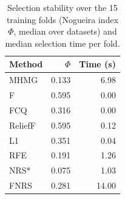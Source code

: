 \begin{table}[!t]
\centering
\caption{Selection stability over the 15 training folds (Nogueira index $\Phi$, median over datasets) and median selection time per fold.}
\label{tab:stab}
\scriptsize
\begin{tabular*}{\columnwidth}{@{\extracolsep{\fill}}lrr@{}}
\toprule
Method & $\Phi$ & Time (s) \\
\midrule
MHMG & 0.133 & 6.98 \\
F & 0.595 & 0.00 \\
FCQ & 0.316 & 0.00 \\
ReliefF & 0.595 & 0.12 \\
L1 & 0.351 & 0.04 \\
RFE & 0.191 & 1.26 \\
NRS* & 0.075 & 1.03 \\
FNRS & 0.281 & 14.00 \\
\bottomrule
\end{tabular*}
\end{table}
